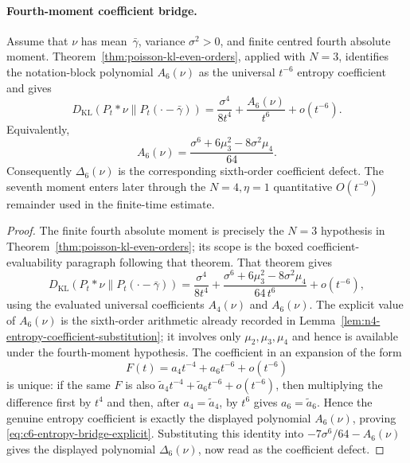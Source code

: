\paragraph{Fourth-moment coefficient bridge.}

\begin{lemma}%
\label{lem:fourth-moment-coefficient-bridge}
Assume that $\nu$ has mean~$\bar{\gamma}$, variance $\sigma^2>0$, and finite
centred fourth absolute moment.  Theorem~\ref{thm:poisson-kl-even-orders},
applied with \(N=3\), identifies the notation-block polynomial \(A_6(\nu)\)
as the universal \(t^{-6}\) entropy coefficient and gives
\[
D_{\mathrm{KL}}(P_t*\nu\|P_t(\cdot-\bar{\gamma}))
=\frac{\sigma^4}{8t^4}+\frac{A_6(\nu)}{t^6}
+o(t^{-6}).
\]
Equivalently,
\begin{equation}\label{eq:c6-entropy-bridge-explicit}
A_6(\nu)
=\frac{\sigma^6+6\mu_3^2-8\sigma^2\mu_4}{64}.
\end{equation}
Consequently \(\Delta_6(\nu)\) is the corresponding sixth-order
coefficient defect.  The seventh moment enters later through the
\(N=4,\eta=1\) quantitative \(O(t^{-9})\) remainder used in the finite-time
estimate.
\end{lemma}

\begin{proof}
The finite fourth absolute moment is precisely the \(N=3\) hypothesis in
Theorem~\ref{thm:poisson-kl-even-orders}; its scope is the boxed
coefficient-evaluability paragraph following that theorem.
That theorem gives
\[
D_{\mathrm{KL}}(P_t*\nu\|P_t(\cdot-\bar{\gamma}))
=\frac{\sigma^4}{8t^4}
+\frac{\sigma^6+6\mu_3^2-8\sigma^2\mu_4}{64\,t^6}
+o(t^{-6}),
\]
using the evaluated universal coefficients \(A_4(\nu)\) and
\(A_6(\nu)\).  The explicit value of \(A_6(\nu)\) is the sixth-order arithmetic already recorded
in Lemma~\ref{lem:n4-entropy-coefficient-substitution}; it involves only
\(\mu_2,\mu_3,\mu_4\) and hence is available under the fourth-moment
hypothesis.
The coefficient in an expansion of the form
\[
F(t)=a_4t^{-4}+a_6t^{-6}+o(t^{-6})
\]
is unique: if the same \(F\) is also
\(\tilde a_4t^{-4}+\tilde a_6t^{-6}+o(t^{-6})\), then multiplying the
difference first by \(t^4\) and then, after \(a_4=\tilde a_4\), by \(t^6\)
gives \(a_6=\tilde a_6\).  Hence the genuine entropy coefficient is exactly
the displayed polynomial \(A_6(\nu)\), proving
\eqref{eq:c6-entropy-bridge-explicit}.  Substituting this identity into
\(-7\sigma^6/64-A_6(\nu)\) gives the displayed polynomial
\(\Delta_6(\nu)\), now read as the coefficient defect.
\end{proof}

